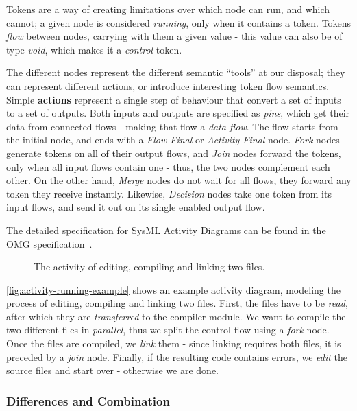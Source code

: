 Tokens are a way of creating limitations over which node can run, and which cannot; a given node is considered \emph{running}, only when it contains a token. Tokens \emph{flow} between nodes, carrying with them a given value - this value can also be of type \emph{void}, which makes it a \emph{control} token.

The different nodes represent the different semantic ``tools'' at our disposal; they can represent different actions, or introduce interesting token flow semantics.
Simple \textbf{actions} represent a single step of behaviour that convert a set of inputs to a set of outputs. Both inputs and outputs are specified as \emph{pins}, which get their data from connected flows - making that flow a \emph{data flow}. The flow starts from the initial node, and ends with a \emph{Flow Final} or \emph{Activity Final} node. \emph{Fork} nodes generate tokens on all of their output flows, and \emph{Join} nodes forward the tokens, only when all input flows contain one - thus, the two nodes complement each other. On the other hand, \emph{Merge} nodes do not wait for all flows, they forward any token they receive instantly. Likewise, \emph{Decision} nodes take one token from its input flows, and send it out on its single enabled output flow.

The detailed specification for SysML Activity Diagrams can be found in the OMG specification~\cite{omg_sysml}.

\begin{figure}[!ht]
	\centering
	
	\caption{The activity of editing, compiling and linking two files.}
	\label{fig:activity-running-example}
\end{figure}

\autoref{fig:activity-running-example} shows an example activity diagram, modeling the process of editing, compiling and linking two files. First, the files have to be \textsl{read}, after which they are \textsl{transferred} to the compiler module. We want to compile the two different files in \emph{parallel}, thus we split the control flow using a \textsl{fork} node. Once the files are compiled, we \textsl{link} them - since linking requires both files, it is preceded by a \emph{join} node. Finally, if the resulting code contains errors, we \textsl{edit} the source files and start over - otherwise we are done.

\iffalse
\subsubsection{Differences and Combination}

